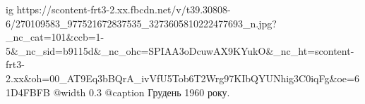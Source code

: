  
 
 
 
 

\ifcmt
  ig https://scontent-frt3-2.xx.fbcdn.net/v/t39.30808-6/270109583_977521672837535_3273605810222477693_n.jpg?_nc_cat=101&ccb=1-5&_nc_sid=b9115d&_nc_ohc=SPIAA3oDcuwAX9KYukO&_nc_ht=scontent-frt3-2.xx&oh=00_AT9Eq3bBQrA_ivVfU5Tob6T2Wrg97KIbQYUNhig3C0iqFg&oe=61D4FBFB
  @width 0.3
	@caption Грудень 1960 року.
\fi
